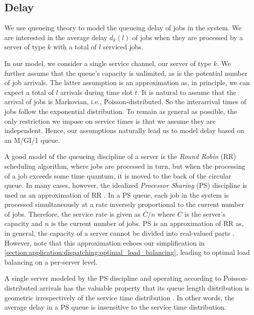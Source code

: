 \subsection{Delay}

We use queueing theory to model the queueing delay of jobs in the system. We are interested in the average delay $d_{k}(l)$ of jobs when they are processed by a server of type $k$ with a total of $l$ serviced jobs.

In our model, we consider a single service channel, our server of type $k$. We further assume that the queue's capacity is unlimited, as is the potential number of job arrivals. The latter assumption is an approximation as, in principle, we can expect a total of $l$ arrivals during time slot $t$. It is natural to assume that the arrival of jobs is Markovian, i.e., Poisson-distributed. So the interarrival times of jobs follow the exponential distribution. To remain as general as possible, the only restriction we impose on service times is that we assume they are independent. Hence, our assumptions naturally lead us to model delay based on an M/GI/1 queue.

A good model of the queueing discipline of a server is the \emph{Round Robin} (RR) scheduling algorithm, where jobs are processed in turn, but when the processing of a job exceeds some time quantum, it is moved to the back of the circular queue. In many cases, however, the idealized \emph{Processor Sharing} (PS) discipline is used as an approximation of RR \cite{Lin2011, Lin2012}. In a PS queue, each job in the system is processed simultaneously at a rate inversely proportional to the current number of jobs. Therefore, the service rate is given as $C / n$ where $C$ is the server's capacity and $n$ is the current number of jobs. PS is an approximation of RR as, in general, the capacity of a server cannot be divided into real-valued parts \cite{Virtamo2007}. However, note that this approximation echoes our simplification in \autoref{section:application:dispatching:optimal_load_balancing}, leading to optimal load balancing on a per-server level.

A single server modeled by the PS discipline and operating according to Poisson-distributed arrivals has the valuable property that its queue length distribution is geometric irrespectively of the service time distribution \cite{Aalto2007}. In other words, the average delay in a PS queue is insensitive to the service time distribution.

